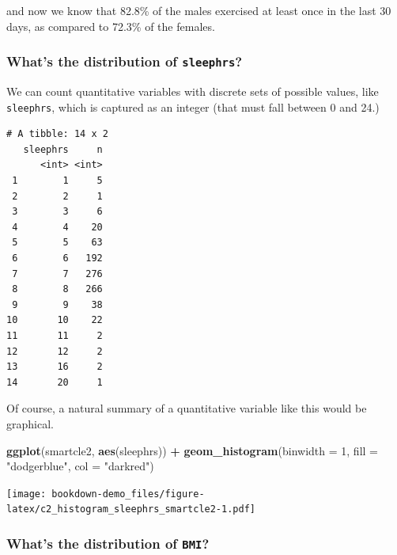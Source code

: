 \documentclass[]{book}
\newenvironment{Shaded}{\begin{snugshade}}{\end{snugshade}}
\newcommand{\KeywordTok}[1]{\textcolor[rgb]{0.13,0.29,0.53}{\textbf{#1}}}
\newcommand{\DataTypeTok}[1]{\textcolor[rgb]{0.13,0.29,0.53}{#1}}
\newcommand{\DecValTok}[1]{\textcolor[rgb]{0.00,0.00,0.81}{#1}}
\newcommand{\StringTok}[1]{\textcolor[rgb]{0.31,0.60,0.02}{#1}}
\newcommand{\OperatorTok}[1]{\textcolor[rgb]{0.81,0.36,0.00}{\textbf{#1}}}
\newcommand{\NormalTok}[1]{#1}
\theoremstyle{definition}
\theoremstyle{definition}
\theoremstyle{definition}
\theoremstyle{remark}
\begin{document}
and now we know that 82.8\% of the males exercised at least once in the
last 30 days, as compared to 72.3\% of the females.

\subsubsection{\texorpdfstring{What's the distribution of
\texttt{sleephrs}?}{What's the distribution of sleephrs?}}\label{whats-the-distribution-of-sleephrs}

We can count quantitative variables with discrete sets of possible
values, like \texttt{sleephrs}, which is captured as an integer (that
must fall between 0 and 24.)

\begin{Shaded}
\end{Shaded}

\begin{verbatim}
# A tibble: 14 x 2
   sleephrs     n
      <int> <int>
 1        1     5
 2        2     1
 3        3     6
 4        4    20
 5        5    63
 6        6   192
 7        7   276
 8        8   266
 9        9    38
10       10    22
11       11     2
12       12     2
13       16     2
14       20     1
\end{verbatim}

Of course, a natural summary of a quantitative variable like this would
be graphical.

\begin{Shaded}
\begin{Highlighting}[]
\KeywordTok{ggplot}\NormalTok{(smartcle2, }\KeywordTok{aes}\NormalTok{(sleephrs)) }\OperatorTok{+}
\StringTok{    }\KeywordTok{geom_histogram}\NormalTok{(}\DataTypeTok{binwidth =} \DecValTok{1}\NormalTok{, }\DataTypeTok{fill =} \StringTok{"dodgerblue"}\NormalTok{, }\DataTypeTok{col =} \StringTok{"darkred"}\NormalTok{)}
\end{Highlighting}
\end{Shaded}

\texttt{[image: bookdown-demo\_files/figure-latex/c2\_histogram\_sleephrs\_smartcle2-1.pdf]}

\subsubsection{\texorpdfstring{What's the distribution of
\texttt{BMI}?}{What's the distribution of BMI?}}\label{whats-the-distribution-of-bmi}
\end{document}
